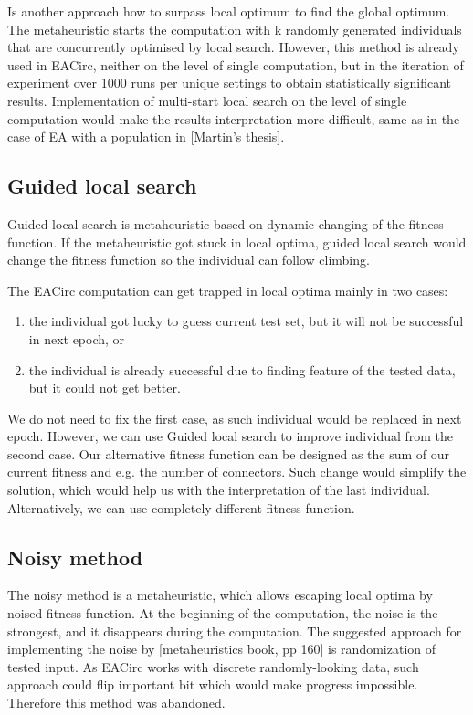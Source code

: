 \documentclass[
  print, %
  Table,   %
  nolof,     %
  nolot,     %
  11pt, %
  oneside  %
]{fithesis3}
\begin{document}
Is another approach how to surpass local optimum to find the global optimum. The metaheuristic starts the computation with k randomly generated individuals that are concurrently optimised by local search. However, this method is already used in EACirc, neither on the level of single computation, but in the iteration of experiment over 1000 runs per unique settings to obtain statistically significant results. Implementation of multi-start local search on the level of single computation would make the results interpretation more difficult, same as in the case of EA with a population in [Martin's thesis].

\subsection{Guided local search}
\label{subsec:opt-single-sol-gls}

Guided local search is metaheuristic based on dynamic changing of the fitness function. If the metaheuristic got stuck in local optima, guided local search would change the fitness function so the individual can follow climbing.

The EACirc computation can get trapped in local optima mainly in two cases:

\begin{enumerate}
    \item the individual got lucky to guess current test set, but it will not be successful in next epoch, or
    \item the individual is already successful due to finding feature of the tested data, but it could not get better.
\end{enumerate}

We do not need to fix the first case, as such individual would be replaced in next epoch. However, we can use Guided local search to improve individual from the second case. Our alternative fitness function can be designed as the sum of our current fitness and e.g. the number of connectors. Such change would simplify the solution, which would help us with the interpretation of the last individual. Alternatively, we can use completely different fitness function.

\subsection{Noisy method}
\label{subsec:opt-single-sol-nois}

The noisy method is a metaheuristic, which allows escaping local optima by noised fitness function. At the beginning of the computation, the noise is the strongest, and it disappears during the computation. The suggested approach for implementing the noise by [metaheuristics book, pp 160] is randomization of tested input. As EACirc works with discrete randomly-looking data, such approach could flip important bit which would make progress impossible. Therefore this method was abandoned.
\end{document}
